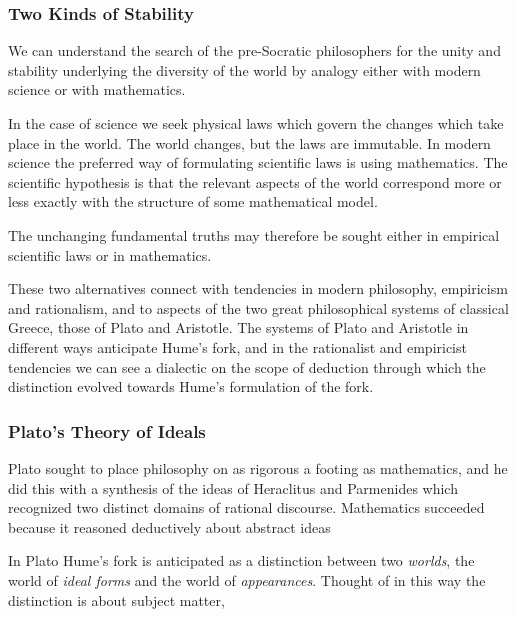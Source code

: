 \subsubsection{Two Kinds of Stability}

We can understand the search of the pre-Socratic philosophers for the
unity and stability underlying the diversity of the world by analogy
either with modern science or with mathematics.

In the case of science we seek physical laws which govern the changes
which take place in the world.
The world changes, but the laws are immutable.
In modern science the preferred way of formulating scientific laws is
using mathematics.
The scientific hypothesis is that the relevant aspects of the world
correspond more or less exactly with the structure of some
mathematical model.

The unchanging fundamental truths may therefore be sought either in empirical
scientific laws or in mathematics.

These two alternatives connect with tendencies in modern philosophy,
empiricism and rationalism, and to aspects of the two great
philosophical systems of classical Greece, those of Plato and Aristotle.
The systems of Plato and Aristotle in different ways anticipate Hume's
fork, and in the rationalist and empiricist tendencies we can see a
dialectic on the scope of deduction through which the distinction
evolved towards Hume's formulation of the fork. 

\subsubsection{Plato's Theory of Ideals}

Plato sought to place philosophy on as rigorous a footing as
mathematics, and he did this with a synthesis of the ideas of
Heraclitus and Parmenides which recognized two distinct domains of
rational discourse.
Mathematics succeeded because it reasoned deductively about abstract ideas


In Plato Hume's fork is anticipated as a distinction between two \emph{worlds}, the world of \emph{ideal forms} and the world of \emph{appearances}.
Thought of in this way the distinction is about subject matter, 




